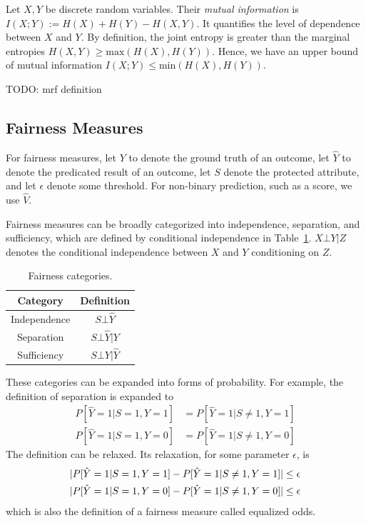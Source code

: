 \documentclass[manuscript,screen,review,anonymous]{acmart}
\DeclarePairedDelimiter{\abs}{\lvert}{\rvert}
\newcommand{\mi}[2]{I(#1;#2)}
\newcommand{\entropy}[1]{H(#1)}
\begin{document}
Let $X,Y$ be discrete random variables. Their \emph{mutual information} is $\mi{X}{Y} := \entropy{X} + \entropy{Y} - \entropy{X,Y}$. It quantifies the level of dependence between $X$ and $Y$. By definition\cite{entropy_lecture_notes}, the joint entropy is greater than the marginal entropies $\entropy{X,Y} \geq \text{max}(\entropy{X},\entropy{Y})$. Hence, we have an upper bound of mutual information $\mi{X}{Y} \leq \text{min}(\entropy{X}, \entropy{Y})$.


TODO: mrf definition

\subsection{Fairness Measures}

For fairness measures\cite{yuan2024ensuring,pessach2022review}, let $Y$ to denote the ground truth of an outcome, let $\hat{Y}$ to denote the predicated result of an outcome, let $S$ denote the protected attribute, and let $\epsilon$ denote some threshold. For non-binary prediction, such as a score, we use $\hat{V}$.

Fairness measures can be broadly categorized into independence, separation, and sufficiency, which are defined by conditional independence in Table~\ref{tab:categories}. $X \bot Y | Z$ denotes the conditional independence between $X$ and $Y$ conditioning on $Z$.

\begin{table}[h]
\caption{Fairness categories.}
\label{tab:categories}
\begin{tabular}{cc}
\toprule
\textbf{Category} & \textbf{Definition} \\
\midrule
Independence & $S \bot \hat{Y}$ \\
Separation & $S \bot \hat{Y} | Y$ \\
Sufficiency & $S \bot Y | \hat{Y}$ \\
\bottomrule
\end{tabular}
\end{table}

These categories can be expanded into forms of probability. For example, the definition of separation is expanded to
\begin{align*}
P[\hat{Y} = 1 | S = 1, Y = 1] & = P[\hat{Y} = 1 | S \neq 1, Y = 1] \\
P[\hat{Y} = 1 | S = 1, Y = 0] & = P[\hat{Y} = 1 | S \neq 1, Y = 0]
\end{align*}
The definition can be relaxed. Its relaxation, for some parameter $\epsilon$, is
\begin{align*}
\abs{P[\hat{Y} = 1 | S = 1, Y = 1] - P[\hat{Y} = 1 | S \neq 1, Y = 1]} & \leq \epsilon \\
\abs{P[\hat{Y} = 1 | S = 1, Y = 0] - P[\hat{Y} = 1 | S \neq 1, Y = 0]} & \leq \epsilon
\end{align*}
which is also the definition of a fairness measure called equalized odds.
\end{document}
